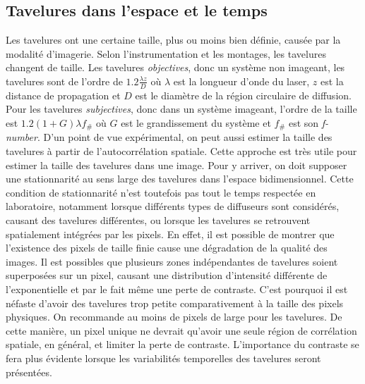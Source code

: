 \documentclass[11pt]{article} %
\begin{document}
\subsection{Tavelures dans l'espace et le temps}
Les tavelures ont une certaine taille, plus ou moins bien définie, causée par la modalité d'imagerie. Selon l'instrumentation et les montages, les tavelures changent de taille. Les tavelures \textit{objectives}, donc un système non imageant, les tavelures sont de l'ordre de $1.2\frac{\lambda z}{D}$ où $\lambda$ est la longueur d'onde du laser, $z$ est la distance de propagation et $D$ est le diamètre de la région circulaire de diffusion. Pour les tavelures \textit{subjectives}, donc dans un système imageant, l'ordre de la taille est $1.2(1 + G)\lambda f_{\#}$ où $G$ est le grandissement du système et $f_{\#}$ est son \textit{f-number}. D'un point de vue expérimental, on peut aussi estimer la taille des tavelures à partir de l'autocorrélation spatiale. Cette approche est très utile pour estimer la taille des tavelures dans une image. Pour y arriver, on doit supposer une stationnarité au sens large des tavelures dans l'espace bidimensionnel. Cette condition de stationnarité n'est toutefois pas tout le temps respectée en laboratoire, notamment lorsque différents types de diffuseurs sont considérés, causant des tavelures différentes, ou lorsque les tavelures se retrouvent spatialement intégrées par les pixels. En effet, il est possible de montrer que l'existence des pixels de taille finie cause une dégradation de la qualité des images. Il est possibles que plusieurs zones indépendantes de tavelures soient superposées sur un pixel, causant une distribution d'intensité différente de l'exponentielle et par le fait même une perte de contraste.  C'est pourquoi il est néfaste d'avoir des tavelures trop petite comparativement à la taille des pixels physiques. On recommande au moins de pixels de large pour les tavelures\cite{kirkpatrick_detrimental_2008}. De cette manière, un pixel unique ne devrait qu'avoir une seule région de corrélation spatiale, en général, et limiter la perte de contraste. L'importance du contraste se fera plus évidente lorsque les variabilités temporelles des tavelures seront présentées.
\\ \\
\end{document}
